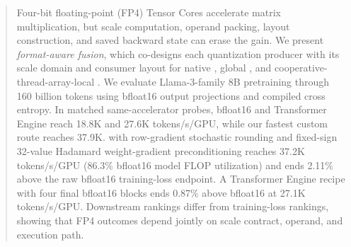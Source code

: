 \begin{abstract}
Four-bit floating-point (FP4) Tensor Cores accelerate matrix multiplication,
but scale computation, operand packing, layout construction, and saved
backward state can erase the gain. We present \emph{format-aware fusion}, which
co-designs each quantization producer with its scale domain and consumer layout
for native \mxfp{}, global \nvfp{}, and cooperative-thread-array-local
\nvfp{}. We evaluate Llama-3-family 8B pretraining through 160 billion tokens
using bfloat16 output projections and compiled cross entropy. In matched
same-accelerator probes, bfloat16 and Transformer Engine \nvfp{} reach 18.8K
and 27.6K tokens/s/GPU, while our fastest custom route reaches 37.9K. \mxfp{}
with row-gradient stochastic rounding and fixed-sign 32-value Hadamard
weight-gradient preconditioning reaches 37.2K tokens/s/GPU (86.3\% bfloat16
model FLOP utilization) and ends 2.11\% above the raw bfloat16 training-loss
endpoint. A Transformer Engine recipe with four final bfloat16 blocks ends
0.87\% above bfloat16 at 27.1K tokens/s/GPU. Downstream rankings differ from
training-loss rankings, showing that FP4 outcomes depend jointly on scale
contract, operand, and execution path.
\end{abstract}
